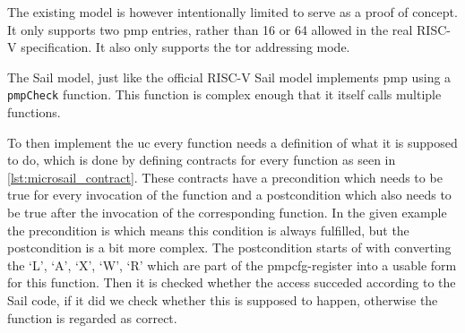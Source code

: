The existing model is however intentionally limited to serve as a proof of concept. 
It only supports two \gls{pmp} entries, rather than 16 or 64 allowed in the real RISC-V specification. 
It also only supports the \gls{tor} addressing mode.

The \textmu{}Sail model, just like the official RISC-V Sail model implements \gls{pmp} using a \texttt{pmpCheck} function.
This function is complex enough that it itself calls multiple functions.

To then implement the \gls{uc} every function needs a definition of what it is supposed to do, which is done by defining contracts for every function as seen in \cref{lst:microsail_contract}. 
These contracts have a precondition which needs to be true for every invocation of the function and a postcondition which also needs to be true after the invocation of the corresponding function.
In the given example the precondition is \top which means this condition is always fulfilled, but the postcondition is a bit more complex.
The postcondition starts of with converting the `L', `A', `X', `W', `R' which are part of the pmpcfg-register into a usable form for this function.
Then it is checked whether the access succeded according to the \textmu{}Sail code, if it did we check whether this is supposed to happen, otherwise the function is regarded as correct.

